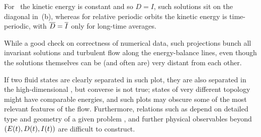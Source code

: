\documentclass{jfm}
\begin{document}
For \reqva\ the kinetic
energy is constant and so $D=I$, such solutions sit on the diagonal in
\,(b), whereas for relative periodic orbits the kinetic
energy is time-periodic, with $\overline{D}=\overline{I}$ only for
long-time averages.

While a good check on correctness of numerical data, such projections
bunch all invariant solutions and turbulent flow along the energy-balance
lines, even though the solutions themselves can be (and often are) very
distant from each other.

If two fluid states are clearly separated in
such plot, they are also separated in the high-dimensional \statesp, but
converse is not true; states of very different topology might have
comparable energies, and such plots may obscure some of the most relevant
features of the flow. Furthermore, relations such as 
depend on detailed type and geometry of a given problem
\citep{ksgreene88,SCD07}, and further physical observables beyond
$(E(t),D(t),I(t))$ are difficult to construct.
\end{document}
